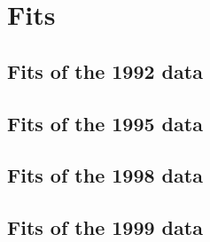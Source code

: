 \section { Fits }


\subsection { Fits of the 1992 data }

\subsection { Fits of the 1995 data }

\subsection { Fits of the 1998 data }

\subsection { Fits of the 1999 data }

